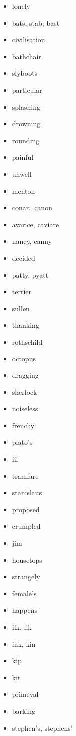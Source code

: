 \documentclass{article}
\begin{document}
\begin{itemize}
    \item lonely
    \item bats, stab, bast
    \item civilisation
    \item bathchair
    \item slyboots
    \item particular
    \item splashing
    \item drowning
    \item rounding
    \item painful
    \item unwell
    \item menton
    \item conan, canon
    \item avarice, caviare
    \item nancy, canny
    \item decided
    \item patty, pyatt
    \item terrier
    \item sullen
    \item thanking
    \item rothschild
    \item octopus
    \item dragging
    \item sherlock
    \item noiseless
    \item frenchy
    \item plato's
    \item iii
    \item tramfare
    \item stanislaus
    \item proposed
    \item crumpled
    \item jim
    \item housetops
    \item strangely
    \item female's
    \item happens
    \item ilk, lik
    \item ink, kin
    \item kip
    \item kit
    \item primeval
    \item barking
    \item stephen's, stephens'

\end{itemize}
\end{document}
